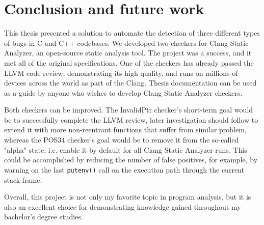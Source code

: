 \chapter{Conclusion and future work} %
\label{ch:sum}


This thesis presented a solution to automate the detection of three different types of bugs in C and C++ codebases.
We developed two checkers for Clang Static Analyzer, an open-source static analysis tool.
The project was a success, and it met all of the original specifications.
One of the checkers has already passed the LLVM code review, demonstrating its high quality, and runs on millions of devices across the world as part of the Clang. Thesis documentation can be used as a guide by anyone who wishes to develop Clang Static Analyzer checkers. 


Both checkers can be improved.
The InvalidPtr checker's short-term goal would be to successfully complete the LLVM review, later investigation should follow to extend it with more non-reentrant functions that suffer from similar problem, whereas the POS34 checker's goal would be to remove it from the so-called "alpha" state, i.e. enable it by default for all Clang Static Analyzer runs.
This could be accomplished by reducing the number of false positives, for example, by warning on the last \lstinline{putenv()} call on the execution path through the current stack frame.



Overall, this project is not only my favorite topic in program analysis, but it is also an excellent choice for demonstrating knowledge gained throughout my bachelor's degree studies.


